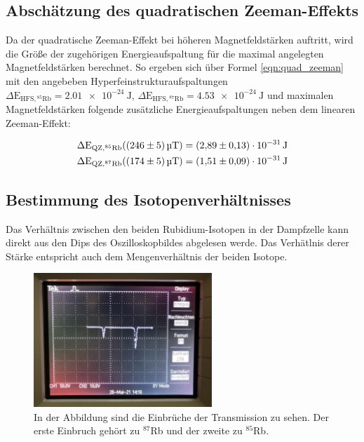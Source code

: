     \subsection{Abschätzung des quadratischen Zeeman-Effekts}
        Da der quadratische Zeeman-Effekt bei höheren Magnetfeldstärken auftritt, wird die Größe der zugehörigen Energieaufspaltung für die maximal angelegten Magnetfeldstärken berechnet. So ergeben sich über
        Formel \ref{eqn:quad_zeeman} mit den angebeben Hyperfeinstrukturaufspaltungen~\cite{tu_dortmund_versuchsanleitung_2021} 
        $\Delta\text{E}_{\text{HFS}, {}^{85}\text{Rb}} =  \SI{2.01 e-24}{\joule}$, $\Delta\text{E}_{\text{HFS}, {}^{87}\text{Rb}} = \SI{4.53 e-24}{\joule}$ und maximalen Magnetfeldstärken folgende 
        zusätzliche Energieaufspaltungen neben dem linearen Zeeman-Effekt:

        \begin{align*}
            \Delta\text{E}_{\text{QZ}, {}^{85}\text{Rb}} (\SI{246 +- 5}{\micro\tesla})= \SI{2.89\pm0.13 e-31}{\joule} \\
            \Delta\text{E}_{\text{QZ}, {}^{87}\text{Rb}} (\SI{174 +- 5}{\micro\tesla})= \SI{1.51\pm0.09 e-31}{\joule}
        \end{align*}



    \subsection{Bestimmung des Isotopenverhältnisses}
        Das Verhältnis zwischen den beiden Rubidium-Isotopen in der Dampfzelle kann direkt aus den Dips des Oszilloskopbildes abgelesen werde. Das Verhätlnis derer Stärke entspricht auch dem Mengenverhältnis
        der beiden Isotope.


        \FloatBarrier

        \begin{figure}[h]
          \centering
          \includegraphics[width = 0.6\textwidth]{pictures/isotop_vergleich.jpg}
          \caption{In der Abbildung sind die Einbrüche der Transmission zu sehen. Der erste Einbruch gehört zu ${}^{87}$Rb und der zweite zu ${}^{85}$Rb.}
          \label{fig:isotop_vergleich}
        \end{figure}

